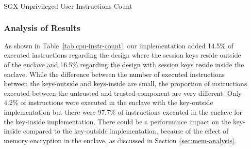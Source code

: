 \documentclass[../../../main.tex]{subfiles}
\begin{document}
\begin{table}[H]
  \caption{SGX Unprivileged User Instructions Count}
  \label{tab:sgx-enclu}
\end{table}

\subsubsection*{Analysis of Results}
As shown in Table~\ref{tab:cpu-instr-count}, our implementation added 14.5\% of
executed instructions regarding the design where the session keys reside
outside of the enclave and 16.5\% regarding the design with session keys
reside inside the enclave. While the difference between the number of executed
instructions between the keys-outside and keys-inside are small, the proportion
of instructions executed between the untrusted and trusted component are very
different. Only 4.2\% of instructions were executed in the enclave with the
key-outside implementation but there were 97.7\% of instructions executed in
the enclave for the key-inside implementation. There could be a performance
impact on the key-inside compared to the key-outside implementation, because of
the effect of memory encryption in the enclave, as discussed in
Section~\ref{sec:mem-analysis}.

\end{document}
